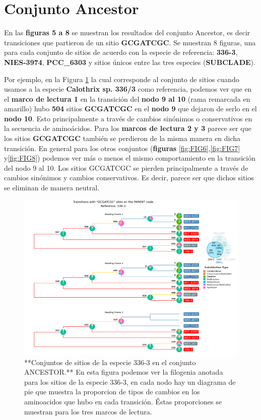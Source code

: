 \documentclass[
]{book}
\begin{document}
\hypertarget{conjunto-ancestor}{%
\section{Conjunto Ancestor}\label{conjunto-ancestor}}

En las \textbf{figuras 5 a 8} se muestran los resultados del conjunto Ancestor, es decir transiciones que partieron de un sitio \textbf{GCGATCGC}. Se muestran 8 figuras, una para cada conjunto de sitios de acuerdo con la especie de referencia: \textbf{336-3}, \textbf{NIES-3974}, \textbf{PCC\_6303} y sitios únicos entre las tres especies (\textbf{SUBCLADE}).

Por ejemplo, en la Figura \ref{fig:FIG5} la cual corresponde al conjunto de sitios cuando usamos a la especie \textbf{Calothrix sp. 336/3} como referencia, podemos ver que en el \textbf{marco de lectura 1} en la transición del \textbf{nodo 9 al 10} (rama remarcada en amarillo) hubo \textbf{504} sitios \textbf{GCGATCGC} en el \textbf{nodo 9} que dejaron de serlo en el \textbf{nodo 10}. Esto principalmente a través de cambios sinónimos o conservativos en la secuencia de aminoácidos. Para los \textbf{marcos de lectura 2 y 3} parece ser que los sitios \textbf{GCGATCGC} también se perdieron de la misma manera en dicha transición. En general para los otros conjuntos (\textbf{figuras} \ref{fig:FIG6},\ref{fig:FIG7} y\ref{fig:FIG8}) podemos ver más o menos el mismo comportamiento en la transición del nodo 9 al 10. Los sitios GCGATCGC se pierden principalmente a través de cambios sinónimos y cambios conservativos. Es decir, parece ser que dichos sitios se eliminan de manera neutral.

\begin{figure}

{\centering \includegraphics[width=1.2\linewidth]{Clados/Calothrix_B/figures/A/GCGATCGC/Ancestor/336-3_Ancestor_A_tree} 

}

\caption{**Conjuntos de sitios de la especie 336-3 en el conjunto ANCESTOR.** En esta figura podemos ver la filogenia anotada para los sitios de la especie 336-3, en cada nodo hay un diagrama de pie que muestra la proporcion de tipos de cambios en los aminoacidos que hubo en cada transición. Éstas proporciones se muestran para los tres marcos de lectura.}\label{fig:FIG5}
\end{figure}
\end{document}
